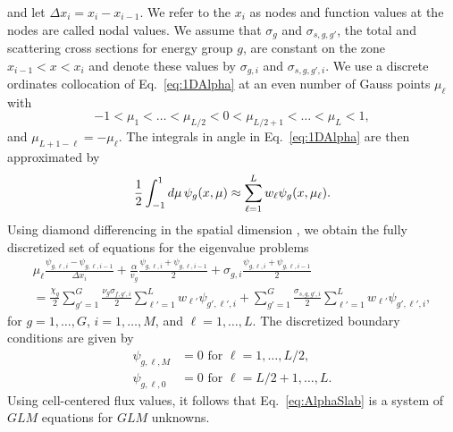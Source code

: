 and let $\Delta x_{i} = x_{i} - x_{i-1}$. We refer to the $x_{i}$ as nodes and function values at the nodes are called nodal values. We assume that $\sigma_{g}$ and $\sigma_{s,g,g'}$, the total and scattering cross sections for energy group $g$, are constant on the zone $x_{i-1} < x < x_{i}$ and denote these values by $\sigma_{g,i}$ and $\sigma_{s,g,g',i}$. We use a discrete ordinates collocation of Eq.~\ref{eq:1DAlpha} at an even number of Gauss points $\mu_{\ell}$ with
\begin{equation*}
	-1 < \mu_{1} < \dots < \mu_{L/2} < 0 < \mu_{L/2+1} < \dots < \mu_{L} < 1, 
\end{equation*}
and $\mu_{L+1-\ell} = - \mu_{\ell}$. The integrals in angle in Eq.~\ref{eq:1DAlpha} are then approximated by
\begin{equation*}
	\frac{1}{2} \int_{-1}^{1} \mathop{}\!d \mu \, \psi_{g}(x, \mu) \approx \sum_{\ell=1}^{L} w_{\ell} \psi_{g}(x, \mu_{\ell}).
\end{equation*}
Using diamond differencing in the spatial dimension \cite{lewis_computational_1984}, we obtain the fully discretized set of equations for the eigenvalue problems
\begin{multline}
	\mu_{\ell} \frac{ \psi_{g,\ell,i} - \psi_{g, \ell, i-1}}{\Delta x_{i}} + \frac{\alpha}{v_{g}} \frac{\psi_{g,\ell,i} + \psi_{g, \ell, i-1}}{2} + \sigma_{g,i} \frac{\psi_{g,\ell,i} + \psi_{g, \ell, i-1}}{2} \\ = \frac{\chi_{g}}{2} \sum_{g'=1}^{G} \frac{\nu_{g}\sigma_{f,g',i}}{2} \sum_{\ell' = 1}^{L} w_{\ell'} \psi_{g',\ell',i} + \sum_{g'=1}^{G} \frac{\sigma_{s,g,g',i}}{2} \sum_{\ell' = 1}^{L} w_{\ell'} \psi_{g',\ell',i},
\label{eq:AlphaSlab}
\end{multline}
for $g = 1, \dots, G$, $i = 1, \dots, M$, and $\ell = 1, \dots, L$. The discretized boundary conditions are given by
\begin{align*}
\psi_{g,\ell,M} &= 0 \text{ for } \ell = 1, \dots, L/2,  \\
\psi_{g,\ell,0} &= 0 \text{ for } \ell = L/2+1, \dots, L.
\end{align*}
Using cell-centered flux values, it follows that Eq.~\ref{eq:AlphaSlab} is a system of $GLM$ equations for $GLM$ unknowns. 


